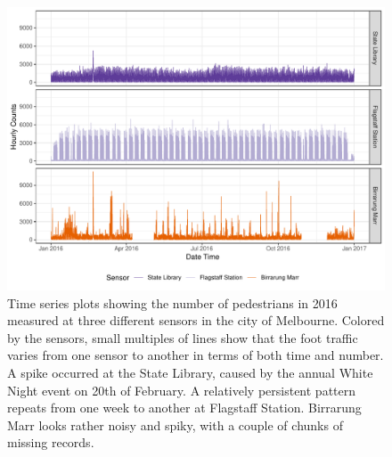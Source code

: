 \documentclass[12pt]{article}
\begin{document}
\begin{figure}

{\centering \includegraphics[width=\textwidth]{figure/time-series-plot-1} 

}

\caption{Time series plots showing the number of pedestrians in 2016 measured at three different sensors in the city of Melbourne. Colored by the sensors, small multiples of lines show that the foot traffic varies from one sensor to another in terms of both time and number. A spike occurred at the State Library, caused by the annual White Night event on 20th of February. A relatively persistent pattern repeats from one week to another at Flagstaff Station. Birrarung Marr looks rather noisy and spiky, with a couple of chunks of missing records.}\label{fig:time-series-plot}
\end{figure}
\end{document}
